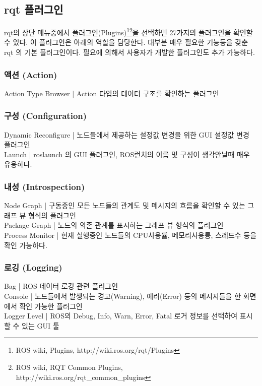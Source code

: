 \subsection{rqt 플러그인}

rqt의 상단 메뉴중에서 플러그인(Plugins)\footnote{ROS wiki, Plugins, http://wiki.ros.org/rqt/Plugins}\footnote{ROS wiki, RQT Common Plugins, http://wiki.ros.org/rqt\_common\_plugins}을 선택하면 27가지의 플러그인을 확인할 수 있다. 이 플러그인은 아래의 역할을 담당한다. 대부분 매우 필요한 기능등을 갖춘 rqt 의 기본 플러그인이다. 필요에 의해서 사용자가 개발한 플러그인도 추가 가능하다.

\subsubsection{액션 (Action)}
Action Type Browser | Action 타입의 데이터 구조를 확인하는 플러그인 
\subsubsection{구성 (Configuration)}
Dynamic Reconfigure | 노드들에서 제공하는 설정값 변경을 위한 GUI 설정값 변경 플러그인\\
Launch | roslaunch 의 GUI 플러그인, ROS런치의 이름 및 구성이 생각안날때 매우 유용하다.\\
\subsubsection{내성 (Introspection)}
Node Graph | 구동중인 모든 노드들의 관계도 및 메시지의 흐름을 확인할 수 있는 그래프 뷰 형식의 플러그인\\
Package Graph | 노드의 의존 관계를 표시하는 그래프 뷰 형식의 플러그인\\
Process Monitor | 현재 실행중인 노드들의 CPU사용률, 메모리사용륭, 스레드수 등을 확인 가능하다.\\
\subsubsection{로깅 (Logging)}
Bag | ROS 데이터 로깅 관련 플러그인\\
Console | 노드들에서 발생되는 경고(Warning), 에러(Error) 등의 메시지들을 한 화면에서 확인 가능한 플러그인\\
Logger Level | ROS의 Debug, Info, Warn, Error, Fatal 로거 정보를 선택하여 표시할 수 있는 GUI 툴\\

